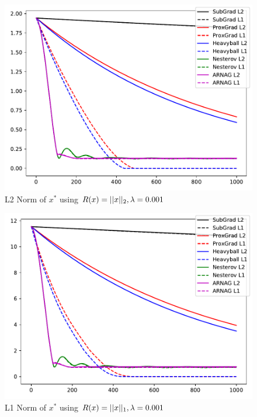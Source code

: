 \documentclass[11pt, answers]{exam}
\begin{document}
\begin{questions}
\begin{solution}
		\begin{figure}[H]
		\centering
		\includegraphics[width=.75\textwidth]{../out/001xl2.pdf}
		\caption{L2 Norm of $x^*$ using $R(x)=|| x ||_2,\lambda=0.001$}
		\end{figure}
		\begin{figure}[H]
		\centering
		\includegraphics[width=.75\textwidth]{../out/001xl1.pdf}
		\caption{L1 Norm of $x^*$ using $R(x)=|| x ||_1,\lambda=0.001$}
		\end{figure}
		

\end{solution}
\end{questions}
\end{document}
